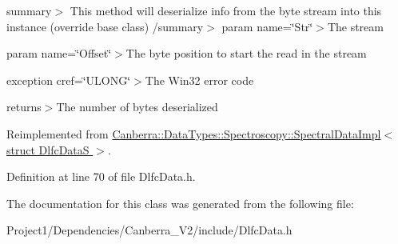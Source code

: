 summary$>$ This method will deserialize info from the byte stream into this instance (override base class) /summary$>$ param name=\char`\"{}\+Str\char`\"{}$>$The stream

param name=\char`\"{}\+Offset\char`\"{}$>$The byte position to start the read in the stream

exception cref=\char`\"{}\+U\+L\+O\+N\+G\char`\"{}$>$The Win32 error code

returns$>$The number of bytes deserialized

Reimplemented from \hyperlink{class_canberra_1_1_data_types_1_1_spectroscopy_1_1_spectral_data_impl_a4d4c4af29ad5f4fc977068478cdc8aeb_a4d4c4af29ad5f4fc977068478cdc8aeb}{Canberra\+::\+Data\+Types\+::\+Spectroscopy\+::\+Spectral\+Data\+Impl$<$ struct Dlfc\+Data\+S $>$}.



Definition at line 70 of file Dlfc\+Data.\+h.



The documentation for this class was generated from the following file\+:\begin{DoxyCompactItemize}
\item 
Project1/\+Dependencies/\+Canberra\+\_\+\+V2/include/Dlfc\+Data.\+h\end{DoxyCompactItemize}
